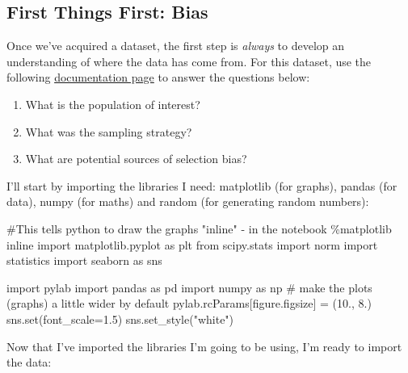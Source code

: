 \documentclass[
  letterpaper,
  DIV=11,
  numbers=noendperiod]{scrreprt}
\newenvironment{Shaded}{\begin{snugshade}}{\end{snugshade}}
\newcommand{\BuiltInTok}[1]{\textcolor[rgb]{0.00,0.23,0.31}{#1}}
\newcommand{\CommentTok}[1]{\textcolor[rgb]{0.37,0.37,0.37}{#1}}
\newcommand{\FloatTok}[1]{\textcolor[rgb]{0.68,0.00,0.00}{#1}}
\newcommand{\ImportTok}[1]{\textcolor[rgb]{0.00,0.46,0.62}{#1}}
\newcommand{\NormalTok}[1]{\textcolor[rgb]{0.00,0.23,0.31}{#1}}
\newcommand{\OperatorTok}[1]{\textcolor[rgb]{0.37,0.37,0.37}{#1}}
\newcommand{\StringTok}[1]{\textcolor[rgb]{0.13,0.47,0.30}{#1}}
\providecommand{\tightlist}{%
  \setlength{\itemsep}{0pt}\setlength{\parskip}{0pt}}\usepackage{longtable,booktabs,array}
\begin{document}
\hypertarget{first-things-first-bias}{%
\subsection{First Things First: Bias}\label{first-things-first-bias}}

Once we've acquired a dataset, the first step is \emph{always} to
develop an understanding of where the data has come from. For this
dataset, use the following
\href{https://www.census.gov/programs-surveys/cps/technical-documentation/methodology.html}{documentation
page} to answer the questions below:

\begin{enumerate}
\def\labelenumi{\arabic{enumi})}
\tightlist
\item
  What is the population of interest?
\item
  What was the sampling strategy?
\item
  What are potential sources of selection bias?
\end{enumerate}

I'll start by importing the libraries I need: matplotlib (for graphs),
pandas (for data), numpy (for maths) and random (for generating random
numbers):

\begin{Shaded}
\begin{Highlighting}[]
\CommentTok{\#This tells python to draw the graphs "inline" {-} in the notebook}
\OperatorTok{\%}\NormalTok{matplotlib inline  }
\ImportTok{import}\NormalTok{ matplotlib.pyplot }\ImportTok{as}\NormalTok{ plt}
\ImportTok{from}\NormalTok{ scipy.stats }\ImportTok{import}\NormalTok{ norm}
\ImportTok{import}\NormalTok{ statistics}
\ImportTok{import}\NormalTok{ seaborn }\ImportTok{as}\NormalTok{ sns}

\ImportTok{import}\NormalTok{ pylab}
\ImportTok{import}\NormalTok{ pandas }\ImportTok{as}\NormalTok{ pd}
\ImportTok{import}\NormalTok{ numpy }\ImportTok{as}\NormalTok{ np}
\CommentTok{\# make the plots (graphs) a little wider by default}
\NormalTok{pylab.rcParams[}\StringTok{\textquotesingle{}figure.figsize\textquotesingle{}}\NormalTok{] }\OperatorTok{=}\NormalTok{ (}\FloatTok{10.}\NormalTok{, }\FloatTok{8.}\NormalTok{)}
\NormalTok{sns.}\BuiltInTok{set}\NormalTok{(font\_scale}\OperatorTok{=}\FloatTok{1.5}\NormalTok{)}
\NormalTok{sns.set\_style(}\StringTok{"white"}\NormalTok{)}
\end{Highlighting}
\end{Shaded}

Now that I've imported the libraries I'm going to be using, I'm ready to
import the data:
\end{document}
